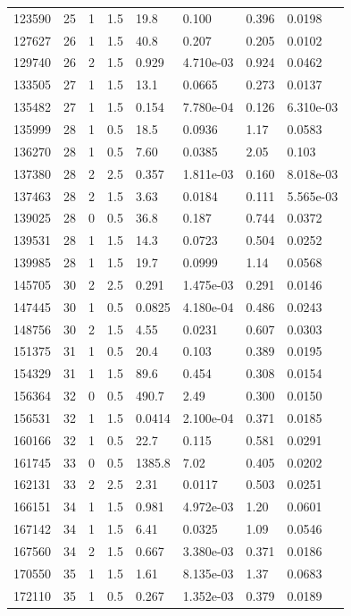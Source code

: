 \documentclass[preview]{standalone}
\begin{document}
{{{\begin{tabular}{L{1.2cm}C{1.2cm} C{0.3cm}C{0.5cm} C{1.4cm}C{1.4cm} C{1.4cm}C{1.4cm}}
  123590  &    25  & 1     & 1.5 &  19.8  & 0.100  & 0.396 &  0.0198   \\ 
  127627  &    26  & 1     & 1.5 &  40.8  & 0.207  & 0.205 &  0.0102   \\ 
  129740  &    26  & 2     & 1.5 &  0.929  & 4.710e-03  & 0.924 &  0.0462   \\ 
  133505  &    27  & 1     & 1.5 &  13.1  & 0.0665  & 0.273 &  0.0137   \\ 
  135482  &    27  & 1     & 1.5 &  0.154  & 7.780e-04  & 0.126 &  6.310e-03   \\ 
  135999  &    28  & 1     & 0.5 &  18.5  & 0.0936  & 1.17 &  0.0583   \\ 
  136270  &    28  & 1     & 0.5 &  7.60  & 0.0385  & 2.05 &  0.103   \\ 
  137380  &    28  & 2     & 2.5 &  0.357  & 1.811e-03  & 0.160 &  8.018e-03   \\ 
  137463  &    28  & 2     & 1.5 &  3.63  & 0.0184  & 0.111 &  5.565e-03   \\ 
  139025  &    28  & 0     & 0.5 &  36.8  & 0.187  & 0.744 &  0.0372   \\ 
  139531  &    28  & 1     & 1.5 &  14.3  & 0.0723  & 0.504 &  0.0252   \\ 
  139985  &    28  & 1     & 1.5 &  19.7  & 0.0999  & 1.14 &  0.0568   \\ 
  145705  &    30  & 2     & 2.5 &  0.291  & 1.475e-03  & 0.291 &  0.0146   \\ 
  147445  &    30  & 1     & 0.5 &  0.0825  & 4.180e-04  & 0.486 &  0.0243   \\ 
  148756  &    30  & 2     & 1.5 &  4.55  & 0.0231  & 0.607 &  0.0303   \\ 
  151375  &    31  & 1     & 0.5 &  20.4  & 0.103  & 0.389 &  0.0195   \\ 
  154329  &    31  & 1     & 1.5 &  89.6  & 0.454  & 0.308 &  0.0154   \\ 
  156364  &    32  & 0     & 0.5 &  490.7  & 2.49  & 0.300 &  0.0150   \\ 
  156531  &    32  & 1     & 1.5 &  0.0414  & 2.100e-04  & 0.371 &  0.0185   \\ 
  160166  &    32  & 1     & 0.5 &  22.7  & 0.115  & 0.581 &  0.0291   \\ 
  161745  &    33  & 0     & 0.5 &  1385.8  & 7.02  & 0.405 &  0.0202   \\ 
  162131  &    33  & 2     & 2.5 &  2.31  & 0.0117  & 0.503 &  0.0251   \\ 
  166151  &    34  & 1     & 1.5 &  0.981  & 4.972e-03  & 1.20 &  0.0601   \\ 
  167142  &    34  & 1     & 1.5 &  6.41  & 0.0325  & 1.09 &  0.0546   \\ 
  167560  &    34  & 2     & 1.5 &  0.667  & 3.380e-03  & 0.371 &  0.0186   \\ 
  170550  &    35  & 1     & 1.5 &  1.61  & 8.135e-03  & 1.37 &  0.0683   \\ 
  172110  &    35  & 1     & 0.5 &  0.267  & 1.352e-03  & 0.379 &  0.0189   \\ 
\hline 
\end{tabular} 

}}}
\end{document}
